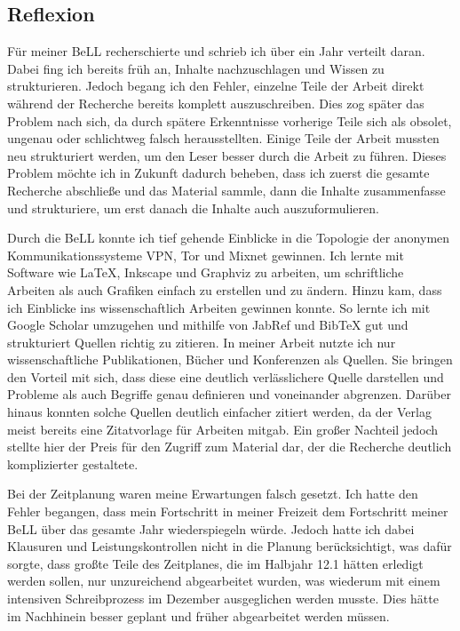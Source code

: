 \subsection{Reflexion}

Für meiner BeLL recherschierte und schrieb ich über ein Jahr verteilt daran. Dabei fing ich bereits früh an, Inhalte nachzuschlagen und Wissen zu strukturieren. Jedoch begang ich den Fehler, einzelne Teile der Arbeit direkt während der Recherche bereits komplett auszuschreiben. Dies zog später das Problem nach sich, da durch spätere Erkenntnisse vorherige Teile sich als obsolet, ungenau oder schlichtweg falsch herausstellten. Einige Teile der Arbeit mussten neu strukturiert werden, um den Leser besser durch die Arbeit zu führen. Dieses Problem möchte ich in Zukunft dadurch beheben, dass ich zuerst die gesamte Recherche abschließe und das Material sammle, dann die Inhalte zusammenfasse und strukturiere, um erst danach die Inhalte auch auszuformulieren.

Durch die BeLL konnte ich tief gehende Einblicke in die Topologie der anonymen Kommunikationssysteme VPN, Tor und Mixnet gewinnen.
Ich lernte mit Software wie LaTeX, Inkscape und Graphviz zu arbeiten, um schriftliche Arbeiten als auch Grafiken einfach zu erstellen und zu ändern. Hinzu kam, dass ich Einblicke ins wissenschaftlich Arbeiten gewinnen konnte. So lernte ich mit Google Scholar umzugehen und mithilfe von JabRef und BibTeX gut und strukturiert Quellen richtig zu zitieren.
In meiner Arbeit nutzte ich nur wissenschaftliche Publikationen, Bücher und Konferenzen als Quellen. Sie bringen den Vorteil mit sich, dass diese eine deutlich verlässlichere Quelle darstellen und Probleme als auch Begriffe genau definieren und voneinander abgrenzen. Darüber hinaus konnten solche Quellen deutlich einfacher zitiert werden, da der Verlag meist bereits eine Zitatvorlage für Arbeiten mitgab. Ein großer Nachteil jedoch stellte hier der Preis für den Zugriff zum Material dar, der die Recherche deutlich komplizierter gestaltete.

Bei der Zeitplanung waren meine Erwartungen falsch gesetzt. Ich hatte den Fehler begangen, dass mein Fortschritt in meiner Freizeit dem Fortschritt meiner BeLL über das gesamte Jahr wiederspiegeln würde. Jedoch hatte ich dabei Klausuren und Leistungskontrollen nicht in die Planung berücksichtigt, was dafür sorgte, dass großte Teile des Zeitplanes, die im Halbjahr 12.1 hätten erledigt werden sollen, nur unzureichend abgearbeitet wurden, was wiederum mit einem intensiven Schreibprozess im Dezember ausgeglichen werden musste. Dies hätte im Nachhinein besser geplant und früher abgearbeitet werden müssen.
